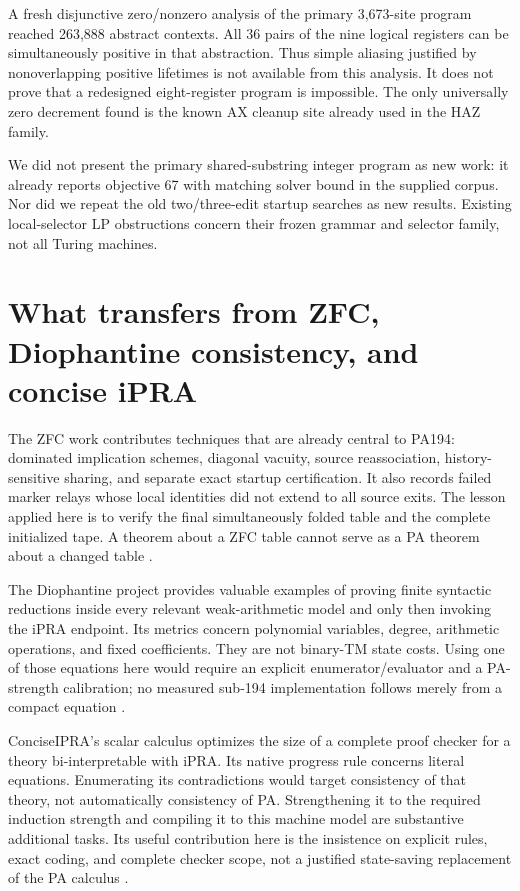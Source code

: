 \documentclass[11pt]{article}
\theoremstyle{definition}\newtheorem{definition}[theorem]{Definition}
\begin{document}
A fresh disjunctive zero/nonzero analysis of the primary 3,673-site program
reached 263,888 abstract contexts. All 36 pairs of the nine logical
registers can be simultaneously positive in that abstraction. Thus simple
aliasing justified by nonoverlapping positive lifetimes is not available
from this analysis. It does not prove that a redesigned eight-register
program is impossible. The only universally zero decrement found is the
known AX cleanup site already used in the HAZ family.

We did not present the primary shared-substring integer program as new
work: it already reports objective 67 with matching solver bound in the
supplied corpus. Nor did we repeat the old two/three-edit startup searches
as new results. Existing local-selector LP obstructions concern their
frozen grammar and selector family, not all Turing machines.

\section{What transfers from ZFC, Diophantine consistency, and concise iPRA}

The ZFC work contributes techniques that are already central to PA194:
dominated implication schemes, diagonal vacuity, source reassociation,
history-sensitive sharing, and separate exact startup certification.
It also records failed marker relays whose local identities did not extend
to all source exits. The lesson applied here is to verify the final
simultaneously folded table and the complete initialized tape. A theorem
about a ZFC table cannot serve as a PA theorem about a changed table
\cite{zfc-readme,zfc-transfer}.

The Diophantine project provides valuable examples of proving finite
syntactic reductions inside every relevant weak-arithmetic model and only
then invoking the iPRA endpoint. Its metrics concern polynomial variables,
degree, arithmetic operations, and fixed coefficients. They are not
binary-TM state costs. Using one of those equations here would require an
explicit enumerator/evaluator and a PA-strength calibration; no measured
sub-194 implementation follows merely from a compact equation
\cite{diophantine-readme}.

ConciseIPRA's scalar calculus optimizes the size of a complete proof checker
for a theory bi-interpretable with iPRA. Its native progress rule concerns
literal equations. Enumerating its contradictions would target consistency
of that theory, not automatically consistency of PA. Strengthening it to
the required induction strength and compiling it to this machine model
are substantive additional tasks. Its useful contribution here is the
insistence on explicit rules, exact coding, and complete checker scope,
not a justified state-saving replacement of the PA calculus
\cite{concise-readme}.
\end{document}

